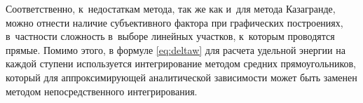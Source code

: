 Соответственно, к~недостаткам метода, так же как и~для метода Казагранде, можно отнести наличие субъективного фактора при графических построениях, в~частности сложность в~выборе линейных участков, к~которым проводятся прямые.
Помимо этого, в формуле \ref{eq:deltaw} для расчета удельной энергии на каждой ступени используется интегрирование методом средних прямоугольников, который для аппроксимирующей аналитической зависимости может быть заменен методом непосредственного интегрирования.


 
